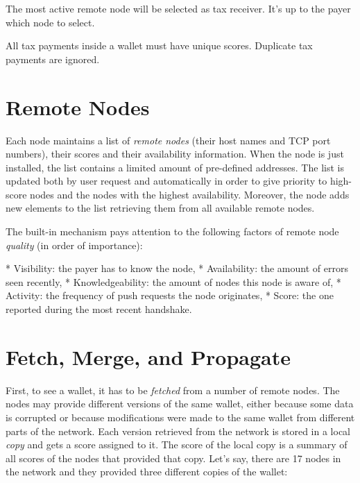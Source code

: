 \documentclass[11pt,oneside]{article}
\begin{document}
The most active remote node will be selected as tax receiver.
It's up to the payer which node to select.

All tax payments inside a wallet must have unique scores.
Duplicate tax payments are ignored.

\section{Remote Nodes}

Each node maintains a list of \emph{remote nodes} (their host names and TCP port numbers),
their scores and their availability information. When the node is just installed,
the list contains a limited amount of pre-defined addresses. The list is
updated both by user request and automatically in order to give priority
to high-score nodes and the nodes with the highest availability.
Moreover, the node adds new elements to the list retrieving them from all
available remote nodes.

The built-in mechanism pays attention to the following factors of
remote node \emph{quality} (in order of importance):

  * Visibility: the payer has to know the node,
  * Availability: the amount of errors seen recently,
  * Knowledgeability: the amount of nodes this node is aware of,
  * Activity: the frequency of push requests the node originates,
  * Score: the one reported during the most recent handshake.

\section{Fetch, Merge, and Propagate}

First, to see a wallet, it has to be \emph{fetched} from a number of remote
nodes. The nodes may provide different versions of the same wallet, either
because some data is corrupted or because modifications were made to the same
wallet from different parts of the network. Each version retrieved from the
network is stored in a local \emph{copy} and gets a score assigned to it.
The score of the local copy is a summary of all scores of the nodes that
provided that copy. Let's say, there are 17 nodes in the network and they
provided three different copies of the wallet:
\end{document}
